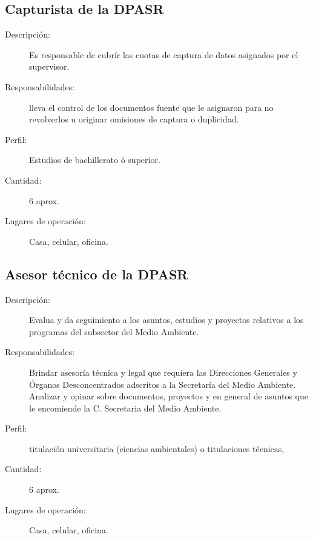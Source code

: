 \subsection{Capturista de la DPASR}

\begin{description}
	\item[Descripción: ] Es responsable de cubrír las cuotas de captura de datos asignados por el supervisor.
	\item[Responsabilidades: ]lleva el control de los documentos fuente que le asignaron para no revolverlos u originar omisiones de captura o duplicidad.
	\item[Perfil: ]  Estudios de bachillerato ó superior.
 
	\item[Cantidad: ] 6 aprox. 
	\item[Lugares de operación: ] Casa, celular, oficina.
\end{description}

\subsection{Asesor técnico de la DPASR}

\begin{description}
	\item[Descripción: ] Evalua y da seguimiento a los asuntos, estudios y proyectos relativos a los programas del subsector del Medio Ambiente.
	\item[Responsabilidades: ]Brindar asesoría técnica y legal que requiera  las Direcciones Generales y Órganos Desconcentrados adscritos a la Secretaría del Medio Ambiente. Analizar y opinar sobre documentos, proyectos y en general de asuntos que le encomiende la C. Secretaria del Medio Ambiente. 
	\item[Perfil: ] titulación universitaria (ciencias ambientales) o titulaciones técnicas,
	\item[Cantidad: ] 6 aprox. 
	\item[Lugares de operación: ] Casa, celular, oficina.
\end{description}